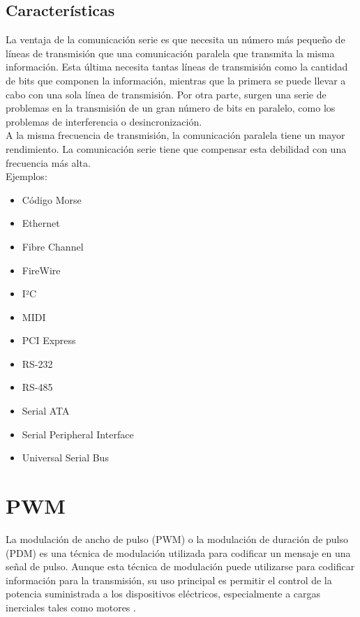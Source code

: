 \subsection{Características}

La ventaja de la comunicación serie es que necesita un número más pequeño de líneas de transmisión que una comunicación paralela que transmita la misma información. Esta última
necesita tantas líneas de transmisión como la cantidad de bits que componen la información, mientras que la primera se puede llevar a cabo con una sola línea de transmisión. Por otra parte,
surgen una serie de problemas en la transmisión de un gran número de bits en paralelo, como los problemas de interferencia o desincronización.\\

A la misma frecuencia de transmisión, la comunicación paralela tiene un mayor rendimiento. La comunicación serie tiene que compensar esta debilidad con una frecuencia más alta.\\

Ejemplos:\\

\begin{itemize}
 \item Código Morse
 \item Ethernet
 \item Fibre Channel
 \item FireWire
 \item I²C
 \item MIDI
 \item PCI Express
 \item RS-232
 \item RS-485
 \item Serial ATA
 \item Serial Peripheral Interface
 \item Universal Serial Bus
\end{itemize}

\section{PWM}

La modulación de ancho de pulso (PWM) o la modulación de duración de pulso (PDM) es una técnica de modulación utilizada para codificar un mensaje en una señal de pulso. 
Aunque esta técnica de modulación puede utilizarse para codificar información para la transmisión, su uso principal es permitir el control de la potencia suministrada a los
dispositivos eléctricos, especialmente a cargas inerciales tales como motores \cite{book:pwm}.\\

